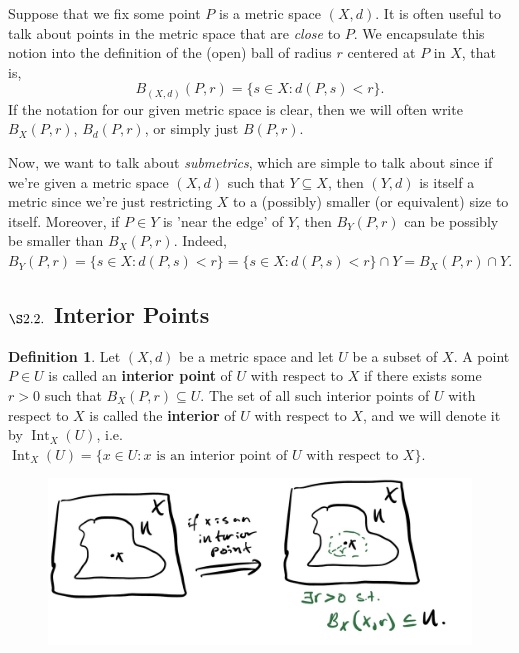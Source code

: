 \documentclass[9pt,reqno]{amsart}
\theoremstyle{definition}
\newtheorem{defi}{Definition}[section]
\DeclareMathOperator{\Int}{Int}
\begin{document}
Suppose that we fix some point $P$ is a metric space $(X, d)$. It is often useful to talk about points in the metric space that are \textit{close} to $P$. We encapsulate this notion into the definition of the (open) ball of radius $r$ centered at $P$ in $X$, that is, $$B_{(X,d) } (P, r) = \{ s \in X \colon d(P,s) < r \}.$$ If the notation for our given metric space is clear, then we will often write $B_X(P,r)$, $B_d (P, r)$, or simply just $B(P, r)$. 

Now, we want to talk about \textit{submetrics}, which are simple to talk about since if we're given a metric space $(X,d)$ such that $Y \subseteq X$, then $(Y,d)$ is itself a metric since we're just restricting $X$ to a (possibly) smaller (or equivalent) size to itself. Moreover, if $P \in Y$ is 'near the edge' of $Y$, then $B_Y(P, r)$ can be possibly be smaller than $B_X(P,r)$. Indeed,  $B_Y (P, r) = \{s \in X \colon d(P,s) < r \} = \{s \in X \colon d(P, s) < r \} \cap Y = B_X(P,r) \cap Y.$

\subsection{$\S2.2.$ Interior Points}
\begin{defi}
Let $(X,d)$ be a metric space and let $U$ be a subset of $X$. A point $P \in U$ is called an \textbf{interior point} of $U$ with respect to $X$ if there exists some $r >0$ such that $B_X (P, r) \subseteq U$. The set of all such interior points of $U$ with respect to $X$ is called the \textbf{interior} of $U$ with respect to $X$, and we will denote it by $\Int _X(U)$, i.e. $\Int_X(U) = \{ x \in U \colon \text{$x$ is an interior point of $U$ with respect to $X$} \}$. 	
\\
\begin{figure}[h!] 
\includegraphics[scale=.17]{m_01.jpg}
\end{figure}
\end{defi}
\end{document}
